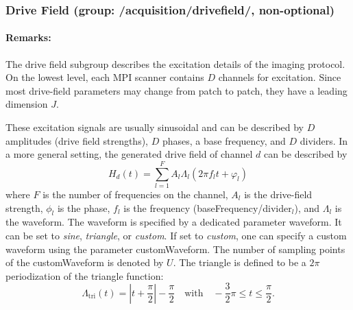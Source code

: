 \documentclass[landscape,a4paper]{article} %
\newcommand{\inlvar}[1]{{\ttfamily#1}}
\begin{document}
\subsubsection{Drive Field (group: \inlvar{/acquisition/drivefield/}, non-optional)}

\begin{multicols}{2}
\paragraph{Remarks:} The drive field subgroup describes the excitation details of the imaging protocol. On the lowest level, each MPI scanner contains $D$ channels for excitation. Since most drive-field parameters may change from patch to patch, they have a leading dimension $J$.

These excitation signals are usually sinusoidal and can be described by $D$ amplitudes (drive field strengths), $D$ phases, a base frequency, and $D$ dividers. In a more general setting, the generated drive field of channel $d$ can be described by
$$
H_d(t) = \sum_{l=1}^{F} A_l \Lambda_l (2\pi f_l t + \varphi_l)
$$
where $F$ is the number of frequencies on the channel, $A_l$ is the drive-field strength, $\phi_l$ is the phase, $f_l$ is the frequency (\inlvar{baseFrequency}/\inlvar{divider}$_l$), and $\Lambda_l$ is the waveform. The waveform is specified by a dedicated parameter \inlvar{waveform}. It can be set to \textit{sine}, \textit{triangle}, or \textit{custom}. If set to \textit{custom}, one can specify a custom waveform using the parameter \inlvar{customWaveform}. The number of sampling points of the \inlvar{customWaveform} is denoted by $U$. The triangle is defined to be a $2\pi$ periodization of the
triangle function:
$$
 \Lambda_\text{tri}(t) = \left\vert t+\frac{\pi}{2}\right\vert - \frac{\pi}{2} \quad \text{with} \quad -\frac{3}{2}\pi\leq t \leq \frac{\pi}{2}.
$$
\end{multicols}
\end{document}
